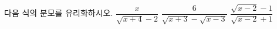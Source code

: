 다음 식의 분모를 유리화하시오.
 $\dfrac{x}{\sqrt{x+4}-2}$
 $\dfrac{6}{\sqrt{x+3}-\sqrt{x-3}}$
 $\dfrac{\sqrt{x-2}-1}{\sqrt{x-2}+1}$
